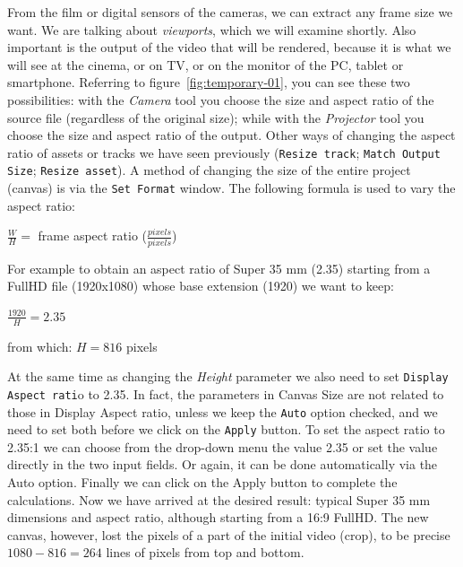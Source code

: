 From the film or digital sensors of the cameras, we can extract any frame size we want. We are talking about \textit{viewports}, which we will examine shortly. Also important is the output of the video that will be rendered, because it is what we will see at the cinema, or on TV, or on the monitor of the PC, tablet or smartphone. Referring to figure~\ref{fig:temporary-01}, you can see these two possibilities: with the \textit{Camera} tool you choose the size and aspect ratio of the source file (regardless of the original size); while with the \textit{Projector} tool you choose the size and aspect ratio of the output. Other ways of changing the aspect ratio of assets or tracks we have seen previously (\texttt{Resize track}; \texttt{Match Output Size}; \texttt{Resize asset}). A method of changing the size of the entire project (canvas) is via the \texttt{Set Format} window. The following formula is used to vary the aspect ratio:

\qquad $\frac{W}{H} =$ frame aspect ratio ($\frac{pixels}{pixels}$)

For example to obtain an aspect ratio of Super 35 mm (2.35) starting from a FullHD file (1920x1080) whose base extension (1920) we want to keep:

\qquad $\frac{1920}{H} = 2.35$

from which: $H = 816$ pixels

At the same time as changing the \textit{Height} parameter we also need to set \texttt{Display Aspect rati}o to 2.35. In fact, the parameters in Canvas Size are not related to those in Display Aspect ratio, unless we keep the \texttt{Auto} option checked, and we need to set both before we click on the \texttt{Apply} button. To set the aspect ratio to 2.35:1 we can choose from the drop-down menu the value 2.35 or set the value directly in the two input fields. Or again, it can be done automatically via the Auto option. Finally we can click on the Apply button to complete the calculations. Now we have arrived at the desired result: typical Super 35 mm dimensions and aspect ratio, although starting from a 16:9 FullHD. The new canvas, however, lost the pixels of a part of the initial video (crop), to be precise $1080 - 816 = 264$ lines of pixels from top and bottom.

